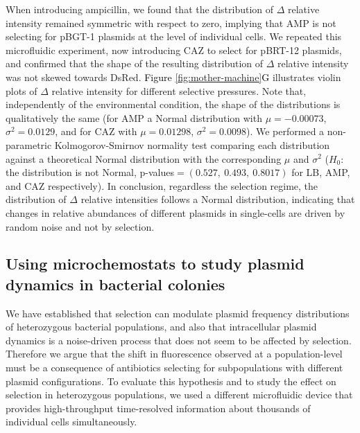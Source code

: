 \documentclass[fleqn,12pt]{wlscirep}
\newcommand{\fig}[1]{\textcolor{black}{#1}}
\begin{document}
When introducing ampicillin, we found that the distribution of $\Delta$ relative intensity remained symmetric with respect to zero, implying that AMP is not selecting for pBGT-1 plasmids at the level of individual cells.  We repeated this microfluidic experiment, now introducing CAZ to select for pBRT-12 plasmids, and confirmed that the shape of the resulting distribution of $\Delta$ relative intensity was not skewed towards DsRed.  \fig{Figure \ref{fig:mother-machine}G} illustrates violin plots of $\Delta$ relative intensity for different selective pressures. Note that, independently of the environmental condition, the shape of the distributions is qualitatively the same (for AMP a Normal distribution with $\mu=-0.00073$, $\sigma^2=0.0129$, and for CAZ with $\mu=0.01298$, $\sigma^2=0.0098$). We performed a non-parametric Kolmogorov-Smirnov normality test comparing each distribution against a theoretical Normal distribution with the corresponding $\mu$ and $\sigma^2$ ($H_0:$ the distribution is not Normal,  p-values$=(0.527,\ 0.493,\ 0.8017)$ for LB, AMP, and CAZ respectively). In conclusion, regardless the selection regime, the distribution of $\Delta$ relative intensities follows a Normal distribution, indicating that changes in relative abundances of different plasmids in single-cells are driven by random noise and not by selection.


\subsection{Using microchemostats to study plasmid dynamics in bacterial colonies}

We have established that selection can modulate plasmid frequency distributions of heterozygous bacterial populations, and also that intracellular plasmid dynamics is a noise-driven process that does not seem to be affected by selection.   Therefore we argue that the shift in fluorescence observed at a population-level must be a consequence of antibiotics selecting for subpopulations with different plasmid configurations. To evaluate this hypothesis and to study the effect on selection in heterozygous populations, we used a different microfluidic device that provides high-throughput time-resolved information about thousands of individual cells simultaneously.
\end{document}
